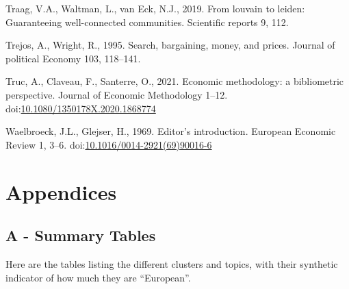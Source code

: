 \documentclass[]{elsarticle} %
\newlength{\cslhangindent}
\newlength{\cslentryspacingunit} %
\newenvironment{CSLReferences}[2] %
 {%
  \setlength{\parindent}{0pt}
  \ifodd #1
  \let\oldpar\par
  \def\par{\hangindent=\cslhangindent\oldpar}
  \fi
  \setlength{\parskip}{#2\cslentryspacingunit}
 }%
 {}
\begin{document}
\begin{CSLReferences}{1}{0}
\leavevmode{}%
Traag, V.A., Waltman, L., van Eck, N.J., 2019. From louvain to leiden:
Guaranteeing well-connected communities. Scientific reports 9, 112.

\leavevmode{}%
Trejos, A., Wright, R., 1995. Search, bargaining, money, and prices.
Journal of political Economy 103, 118--141.

\leavevmode{}%
Truc, A., Claveau, F., Santerre, O., 2021. Economic methodology: a
bibliometric perspective. Journal of Economic Methodology 1--12.
doi:\href{https://doi.org/10.1080/1350178X.2020.1868774}{10.1080/1350178X.2020.1868774}

\leavevmode{}%
Waelbroeck, J.L., Glejser, H., 1969. Editor's introduction. European
Economic Review 1, 3--6.
doi:\href{https://doi.org/10.1016/0014-2921(69)90016-6}{10.1016/0014-2921(69)90016-6}

\end{CSLReferences}

\newpage

\hypertarget{appendices}{%
\section*{Appendices}\label{appendices}}

\hypertarget{a---summary-tables}{%
\subsection*{A - Summary Tables}\label{a---summary-tables}}

Here are the tables listing the different clusters and topics, with
their synthetic indicator of how much they are ``European''.
\end{document}
